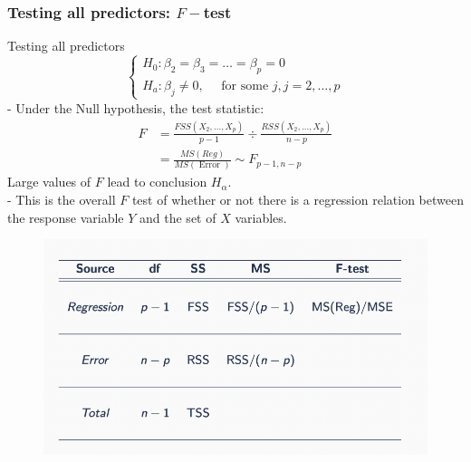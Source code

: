 \documentclass[11pt,a4paper]{article}
\begin{document}
\subsubsection{Testing all predictors: $F-$test}
Testing all predictors
$$
\left\{\begin{array}{l}
H_{0}: \beta_{2}=\beta_{3}=\ldots=\beta_{p}=0 \\
H_{a}: \beta_{j} \neq 0, \quad \text { for some } j, j=2, \ldots, p
\end{array}\right.
$$
- Under the Null hypothesis, the test statistic:
$$
\begin{aligned}
F &=\frac{F S S\left(X_{2}, \ldots, X_{p}\right)}{p-1} \div \frac{R S S\left(X_{2}, \ldots, X_{p}\right)}{n-p} \\
&=\frac{M S(R e g)}{M S(\text { Error })} \sim F_{p-1, n-p}
\end{aligned}
$$
Large values of $F$ lead to conclusion $H_{\alpha}$.\\
- This is the overall $F$ test of whether or not there is a regression relation between the response variable $Y$ and the set of $X$ variables.
\begin{center}\begin{figure}[htbp]
    \centering
    \includegraphics[scale=0.8]{Lec0601.png}
    \caption{}
    \label{}
\end{figure}\end{center}
\end{document}
